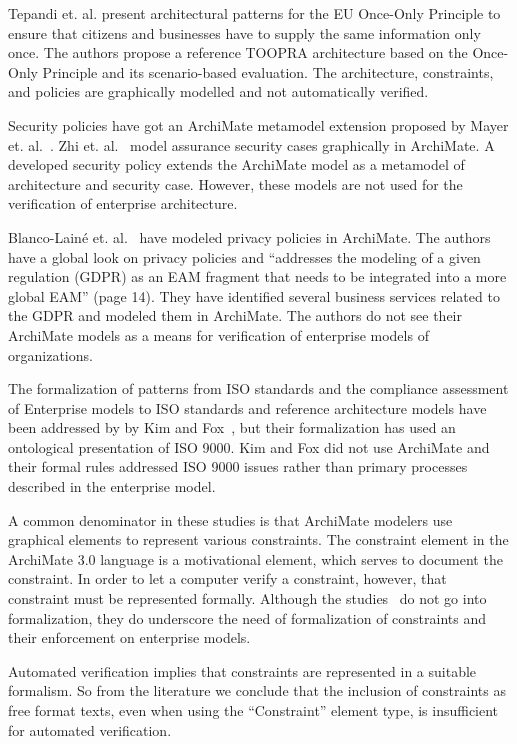 \documentclass[sn-vancouver]{sn-jnl}%
\theoremstyle{thmstyleone}%
\theoremstyle{thmstyletwo}%
\theoremstyle{thmstylethree}%
\begin{document}
Tepandi et. al.\cite{tepandi2019towards} present architectural patterns for the EU Once-Only Principle
to ensure that citizens and businesses have to supply the same information only once.
The authors propose a reference TOOPRA architecture based on the Once-Only Principle and its scenario-based evaluation.
The architecture, constraints, and policies are graphically modelled and not automatically verified.

Security policies have got an ArchiMate metamodel extension proposed by Mayer et. al.~\cite{mayer2019integrated}.
Zhi et. al.~\cite{zhi2018imsa} model assurance security cases graphically in ArchiMate.
A developed security policy extends the ArchiMate model as a metamodel of architecture and security case.
However, these models are not used for the verification of enterprise architecture.

Blanco-Lain\'e et. al.~\cite{blanco2019using} have modeled privacy policies in ArchiMate.
The authors have a global look on privacy policies and
``addresses the modeling of a given regulation (GDPR) as an EAM fragment that needs to be integrated into a more global EAM'' (page 14).
They have identified several business services related to the GDPR and modeled them in ArchiMate.
The authors do not see their ArchiMate models as a means for verification of enterprise models of organizations.

The formalization of patterns from ISO standards and the compliance assessment of Enterprise models to ISO standards and reference architecture models have been addressed by by Kim and Fox~\cite{kim2002using}, but their formalization has used an ontological presentation of ISO 9000.
Kim and Fox did not use ArchiMate and their formal rules addressed ISO 9000 issues rather than primary processes described in the enterprise model.

A common denominator in these studies is that ArchiMate modelers use graphical elements to represent various constraints.
The constraint element in the ArchiMate 3.0 language is a motivational element, which serves to document the constraint.
In order to let a computer verify a constraint, however, that constraint must be represented formally. 
Although the studies~\cite{korman2016modeling,tepandi2019towards,mayer2019integrated,zhi2018imsa,blanco2019using} do not go into formalization,
they do underscore the need of formalization of constraints and  their enforcement on enterprise models.

Automated verification implies that constraints are represented in a suitable formalism.
So from the literature we conclude that the inclusion of constraints as free format texts, even when using the ``Constraint'' element type,
is insufficient for automated verification.
\end{document}
